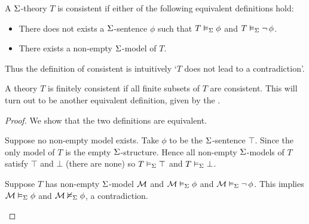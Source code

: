 \begin{dfn}
    A $\Sigma$-theory $T$ is consistent if either of the following equivalent 
    definitions hold:
    \begin{itemize}
        \item
            There does not exists a 
            $\Sigma$-sentence $\phi$ such that
            $T \vDash_{\Sigma} \phi$ and $T \vDash_{\Sigma} \neg\, \phi$.
        \item There exists 
            a non-empty $\Sigma$-model of $T$. 
    \end{itemize}
    Thus the definition of consistent is intuitively 
    `$T$ does not lead to a contradiction'.

    A theory $T$ is finitely consistent if all 
    finite subsets of $T$ are consistent.
    This will turn out to be another equivalent definition,
    given by the .
\end{dfn}
\begin{proof} 
    We show that the two definitions are equivalent.
    \begin{forward}
        Suppose no non-empty model exists.
        Take $\phi$ to be the $\Sigma$-sentence $\top$.
        Since the only model of $T$ is the empty $\Sigma$-structure.
        Hence all non-empty $\Sigma$-models of $T$ satisfy $\top$ and $\bot$
        (there are none) so
        $T \vDash_{\Sigma} \top$ and $T \vDash_{\Sigma} \bot$.
    \end{forward}
    \begin{backward}
        Suppose $T$ has non-empty $\Sigma$-model $\mathcal{M}$
        and $\mathcal{M} \vDash_{\Sigma} \phi$ and $\mathcal{M} \vDash_{\Sigma} \neg\, \phi$.
        This implies $\mathcal{M} \vDash_{\Sigma} \phi$ and $\mathcal{M} \nvDash_{\Sigma} \phi$,
        a contradiction.
    \end{backward}
\end{proof}